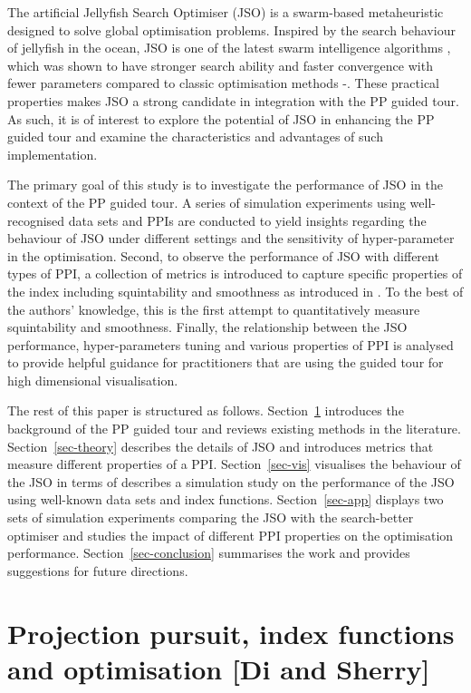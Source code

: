 \documentclass[
  number,
  preprint,
  3p]{elsarticle}
\begin{document}
The artificial Jellyfish Search Optimiser (JSO) \citep{chou_novel_2021}
is a swarm-based metaheuristic designed to solve global optimisation
problems. Inspired by the search behaviour of jellyfish in the ocean,
JSO is one of the latest swarm intelligence algorithms
\citep{rajwar_exhaustive_2023}, which was shown to have stronger search
ability and faster convergence with fewer parameters compared to classic
optimisation methods \citep{chou_novel_2021}-\citep{chou_recent_2022}.
These practical properties makes JSO a strong candidate in integration
with the PP guided tour. As such, it is of interest to explore the
potential of JSO in enhancing the PP guided tour and examine the
characteristics and advantages of such implementation.

The primary goal of this study is to investigate the performance of JSO
in the context of the PP guided tour. A series of simulation experiments
using well-recognised data sets and PPIs are conducted to yield insights
regarding the behaviour of JSO under different settings and the
sensitivity of hyper-parameter in the optimisation. Second, to observe
the performance of JSO with different types of PPI, a collection of
metrics is introduced to capture specific properties of the index
including squintability and smoothness as introduced in
\citet{laa_using_2020}. To the best of the authors' knowledge, this is
the first attempt to quantitatively measure squintability and
smoothness. Finally, the relationship between the JSO performance,
hyper-parameters tuning and various properties of PPI is analysed to
provide helpful guidance for practitioners that are using the guided
tour for high dimensional visualisation.

The rest of this paper is structured as follows.
Section~\ref{sec-background} introduces the background of the PP guided
tour and reviews existing methods in the literature.
Section~\ref{sec-theory} describes the details of JSO and introduces
metrics that measure different properties of a PPI.
Section~\ref{sec-vis} visualises the behaviour of the JSO in terms of
describes a simulation study on the performance of the JSO using
well-known data sets and index functions. Section~\ref{sec-app} displays
two sets of simulation experiments comparing the JSO with the
search-better optimiser and studies the impact of different PPI
properties on the optimisation performance. Section~\ref{sec-conclusion}
summarises the work and provides suggestions for future directions.

\hypertarget{sec-background}{%
\section{Projection pursuit, index functions and optimisation {[}Di and
Sherry{]}}\label{sec-background}}
\end{document}
